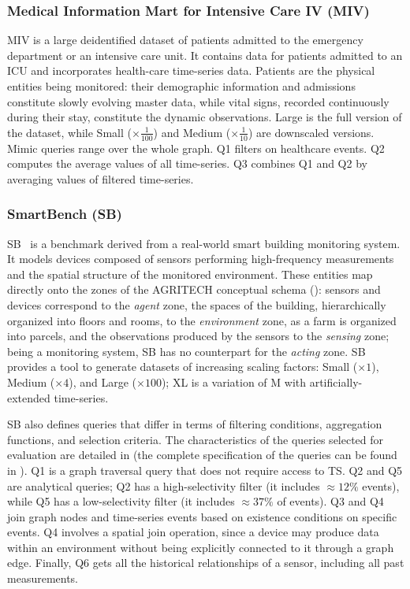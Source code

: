 \subsubsection{Medical Information Mart for Intensive Care IV (\textsf{MIV})}

\textsf{MIV} \cite{johnson2020mimic} is a large deidentified dataset of patients admitted to the emergency department or an intensive care unit.
It contains data for patients admitted to an ICU and incorporates health-care time-series data.
Patients are the physical entities being monitored: their demographic information and admissions constitute slowly evolving master data, while vital signs, recorded continuously during their stay, constitute the dynamic observations.
Large is the full version of the dataset, while Small ($\times\frac{1}{100}$) and Medium ($\times\frac{1}{10}$) are downscaled versions.
Mimic queries range over the whole graph.
Q1 filters on healthcare events.
Q2 computes the average values of all time-series.
Q3 combines Q1 and Q2 by averaging values of filtered time-series. 

\subsubsection{SmartBench (\textsf{SB})}
\textsf{SB}~\cite{DBLP:journals/pvldb/GuptaCMY20} is a benchmark derived from a real-world smart building monitoring system.
It models devices composed of sensors performing high-frequency measurements and the spatial structure of the monitored environment.
These entities map directly onto the zones of the AGRITECH conceptual schema (): sensors and devices correspond to the \emph{agent} zone, the spaces of the building, hierarchically organized into floors and rooms, to the \emph{environment} zone, as a farm is organized into parcels, and the observations produced by the sensors to the \emph{sensing} zone; being a monitoring system, \textsf{SB} has no counterpart for the \emph{acting} zone.
\textsf{SB} provides a tool to generate datasets of increasing scaling factors: Small ($\times1$), Medium ($\times4$), and Large ($\times100$); XL is a variation of M with artificially-extended time-series.

\textsf{SB} also defines queries that differ in terms of filtering conditions, aggregation functions, and selection criteria.
The characteristics of the queries selected for evaluation are detailed in  (the complete specification of the queries can be found in \cite{DBLP:journals/pvldb/GuptaCMY20}).
Q1 is a graph traversal query that does not require access to TS.
Q2 and Q5 are analytical queries; Q2 has a high-selectivity filter (it includes $\approx12\%$ events), while Q5 has a low-selectivity filter (it includes $\approx37\%$ of events).
Q3 and Q4 join graph nodes and time-series events based on existence conditions on specific events.
Q4 involves a spatial join operation, since a device may produce data within an environment without being explicitly connected to it through a graph edge. 
Finally, Q6 gets all the historical relationships of a sensor, including all past measurements.

